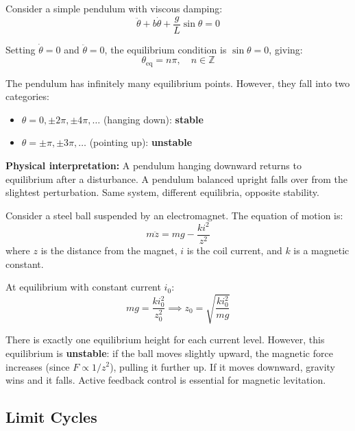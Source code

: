 Consider a simple pendulum with viscous damping:
\begin{equation}
\ddot{\theta} + b\dot{\theta} + \frac{g}{L}\sin\theta = 0
\label{eq:pendulum_nonlinear}
\end{equation}

Setting $\dot{\theta} = 0$ and $\ddot{\theta} = 0$, the equilibrium condition is $\sin\theta = 0$, giving:
\begin{equation}
\theta_{\text{eq}} = n\pi, \quad n \in \mathbb{Z}
\end{equation}

The pendulum has infinitely many equilibrium points. However, they fall into two categories:
\begin{itemize}
    \item $\theta = 0, \pm 2\pi, \pm 4\pi, \ldots$ (hanging down): \textbf{stable}
    \item $\theta = \pm\pi, \pm 3\pi, \ldots$ (pointing up): \textbf{unstable}
\end{itemize}

\textbf{Physical interpretation:} A pendulum hanging downward returns to equilibrium after a disturbance. A pendulum balanced upright falls over from the slightest perturbation. Same system, different equilibria, opposite stability.

\begin{example}
\label{ex:maglev_equilibria}
Consider a steel ball suspended by an electromagnet. The equation of motion is:
\begin{equation}
m\ddot{z} = mg - \frac{ki^2}{z^2}
\end{equation}
where $z$ is the distance from the magnet, $i$ is the coil current, and $k$ is a magnetic constant.

At equilibrium with constant current $i_0$:
\begin{equation}
mg = \frac{ki_0^2}{z_0^2} \implies z_0 = \sqrt{\frac{ki_0^2}{mg}}
\end{equation}

There is exactly one equilibrium height for each current level. However, this equilibrium is \textbf{unstable}: if the ball moves slightly upward, the magnetic force increases (since $F \propto 1/z^2$), pulling it further up. If it moves downward, gravity wins and it falls. Active feedback control is essential for magnetic levitation.
\end{example}

\subsection{Limit Cycles}

